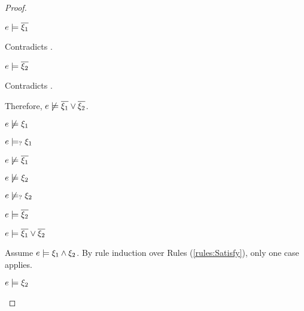 \begin{proof}
\begin{byCases}
\begin{byCases}
        \begin{byCases}
        \item[\text{(\ref{rule:CSOr1})}]
            \begin{pfsteps*}
            \item $e \models \overline{\xi_1}$ 
            \end{pfsteps*}
            Contradicts .
        \item[\text{(\ref{rule:CSOr2})}]
            \begin{pfsteps*}
            \item $e \models \overline{\xi_2}$ 
            \end{pfsteps*}
            Contradicts .
        \end{byCases}
        Therefore, $e \not\models \overline{\xi_1} \vee \overline{\xi_2}$.
    \item[\cmaysatisfy{e}{\xi_1},\csatisfy{e}{\cdual{\xi_2}}]
        \begin{pfsteps*}
        \item $e \not\models \xi_1$  
        \item $e \models_{?} \xi_1$  
        \item $e \not\models \overline{\xi_1}$  
        \item $e \not\models \xi_2$  
        \item $e \not\models_{?} \xi_2$  
        \item $e \models \overline{\xi_2}$  
        \item $e \models \overline{\xi_1} \vee \overline{\xi_2}$  
        \end{pfsteps*}
        Assume $e \models \xi_1 \wedge \xi_2$. By rule induction over Rules (\ref{rules:Satisfy}), only one case applies.
        \begin{byCases}
        \item[\text{(\ref{rule:CSAnd})}]
            \begin{pfsteps*}
            \item $e \models \xi_2$ 

\end{pfsteps*}
\end{byCases}
\end{byCases}
\end{byCases}
\end{proof}
